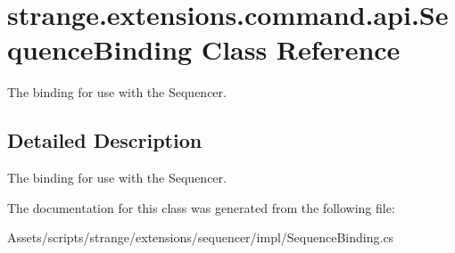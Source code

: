 \hypertarget{classstrange_1_1extensions_1_1command_1_1api_1_1_sequence_binding}{\section{strange.\-extensions.\-command.\-api.\-Sequence\-Binding Class Reference}
\label{classstrange_1_1extensions_1_1command_1_1api_1_1_sequence_binding}
}


The binding for use with the Sequencer.  




\subsection{Detailed Description}
The binding for use with the Sequencer. 

The documentation for this class was generated from the following file\-:\begin{DoxyCompactItemize}
\item 
Assets/scripts/strange/extensions/sequencer/impl/Sequence\-Binding.\-cs\end{DoxyCompactItemize}
